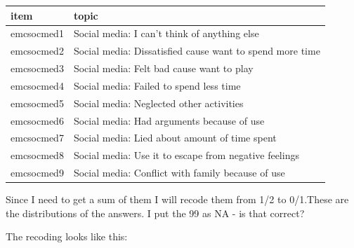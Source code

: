 \documentclass[
]{article}
\begin{document}
\begin{longtable}[]{@{}ll@{}}
\toprule\noalign{}
item & topic \\
\midrule\noalign{}
\endhead
\bottomrule\noalign{}
\endlastfoot
emcsocmed1 & Social media: I can't think of anything else \\
emcsocmed2 & Social media: Dissatisfied cause want to spend more time \\
emcsocmed3 & Social media: Felt bad cause want to play \\
emcsocmed4 & Social media: Failed to spend less time \\
emcsocmed5 & Social media: Neglected other activities \\
emcsocmed6 & Social media: Had arguments because of use \\
emcsocmed7 & Social media: Lied about amount of time spent \\
emcsocmed8 & Social media: Use it to escape from negative feelings \\
emcsocmed9 & Social media: Conflict with family because of use \\
\end{longtable}

Since I need to get a sum of them I will recode them from 1/2 to
0/1.These are the distributions of the answers. I put the 99 as NA - is
that correct?

The recoding looks like this:
\end{document}
